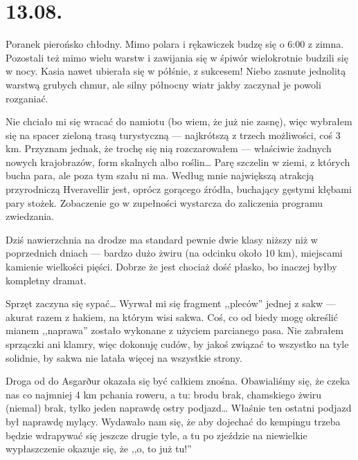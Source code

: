 \chapter*{13.08.}

Poranek pierońsko chłodny. Mimo polara i rękawiczek budzę się o 6:00 z zimna. Pozostali też mimo wielu warstw i zawijania się w śpiwór wielokrotnie budzili się w nocy. Kasia nawet ubierała się w półśnie, z sukcesem! Niebo zasnute jednolitą warstwą grubych chmur, ale silny północny wiatr jakby zaczynał je powoli rozganiać.

Nie chciało mi się wracać do namiotu (bo wiem, że już nie zasnę), więc wybrałem się na spacer zieloną trasą turystyczną --- najkrótszą z trzech możliwości, coś 3 km. Przyznam jednak, że trochę się nią rozczarowałem --- właściwie żadnych nowych krajobrazów, form skalnych albo roślin… Parę szczelin w ziemi, z których bucha para, ale poza tym szału ni ma. Według mnie największą atrakcją przyrodniczą Hveravellir jest, oprócz gorącego źródła, buchający gęstymi kłębami pary stożek. Zobaczenie go w zupełności wystarcza do zaliczenia programu zwiedzania.


Dziś nawierzchnia na drodze ma standard pewnie dwie klasy niższy niż w poprzednich dniach --- bardzo dużo żwiru (na odcinku około 10 km), miejscami kamienie wielkości pięści. Dobrze że jest chociaż dość płasko, bo inaczej byłby kompletny dramat.


Sprzęt zaczyna się sypać… Wyrwał mi się fragment ,,pleców'' jednej z sakw --- akurat razem z hakiem, na którym wisi sakwa. Coś, co od biedy mogę określić mianem ,,naprawa'' zostało wykonane z użyciem parcianego pasa. Nie zabrałem sprzączki ani klamry, więc dokonuję cudów, by jakoś związać to wszystko na tyle solidnie, by sakwa nie latała więcej na wszystkie strony.

Droga od  do Asgarður okazała się być całkiem znośna. Obawialiśmy się, że czeka nas co najmniej 4 km pchania roweru, a tu: brodu brak, chamskiego żwiru (niemal) brak, tylko jeden naprawdę ostry podjazd… Właśnie ten ostatni podjazd był naprawdę mylący. Wydawało nam się, że aby dojechać do kempingu trzeba będzie wdrapywać się jeszcze drugie tyle, a tu po zjeździe na niewielkie wypłaszczenie okazuje się, że ,,o, to już tu!''

